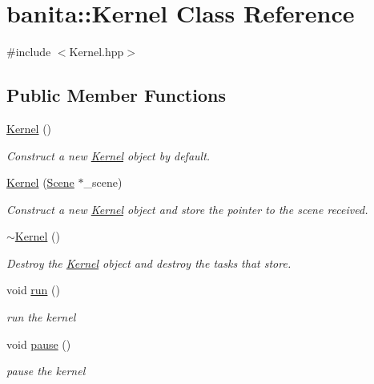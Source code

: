 \hypertarget{classbanita_1_1_kernel}{}\section{banita\+::Kernel Class Reference}
\label{classbanita_1_1_kernel}


{\ttfamily \#include $<$Kernel.\+hpp$>$}

\subsection*{Public Member Functions}
\begin{DoxyCompactItemize}
\item 
\mbox{\hyperlink{classbanita_1_1_kernel_a07f2a762b74482c2e384c84531151cf4}{Kernel}} ()
\begin{DoxyCompactList}\small\item\em Construct a new \mbox{\hyperlink{classbanita_1_1_kernel}{Kernel}} object by default. \end{DoxyCompactList}\item 
\mbox{\hyperlink{classbanita_1_1_kernel_ad0fef1effc29769a6438653e86e04b25}{Kernel}} (\mbox{\hyperlink{classbanita_1_1_scene}{Scene}} $\ast$\+\_\+scene)
\begin{DoxyCompactList}\small\item\em Construct a new \mbox{\hyperlink{classbanita_1_1_kernel}{Kernel}} object and store the pointer to the scene received. \end{DoxyCompactList}\item 
\mbox{\hyperlink{classbanita_1_1_kernel_a76d732a249e2b546288488af3fa7f928}{$\sim$\+Kernel}} ()
\begin{DoxyCompactList}\small\item\em Destroy the \mbox{\hyperlink{classbanita_1_1_kernel}{Kernel}} object and destroy the tasks that store. \end{DoxyCompactList}\item 
void \mbox{\hyperlink{classbanita_1_1_kernel_af596d1e111f5d7dd9d9e483eda630695}{run}} ()
\begin{DoxyCompactList}\small\item\em run the kernel \end{DoxyCompactList}\item 
void \mbox{\hyperlink{classbanita_1_1_kernel_a69c51724e7192464b086b3c357fdcb7f}{pause}} ()
\begin{DoxyCompactList}\small\item\em pause the kernel \end{DoxyCompactList}\item 

\end{DoxyCompactItemize}
